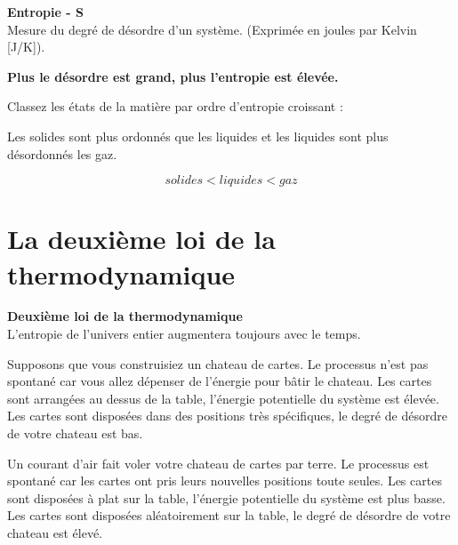 \documentclass[
  11pt,
  a4paper,
  openany]{book}
\begin{document}
\begin{tcolorbox}
\textbf{Entropie - S}\\
Mesure du degré de désordre d'un système. (Exprimée en joules par Kelvin {[}J/K{]}).

\end{tcolorbox}

\textbf{Plus le désordre est grand, plus l'entropie est élevée.}

\begin{Exercise}

Classez les états de la matière par ordre d'entropie croissant :


\end{Exercise}

\begin{Answer}
Les solides sont plus ordonnés que les liquides et les liquides sont plus désordonnés les gaz.

\[
solides < liquides < gaz
\]

\end{Answer}

\section{La deuxième loi de la thermodynamique}\label{la-deuxiuxe8me-loi-de-la-thermodynamique}

\begin{tcolorbox}
\textbf{Deuxième loi de la thermodynamique}\\
L'entropie de l'univers entier augmentera toujours avec le temps.

\end{tcolorbox}

Supposons que vous construisiez un chateau de cartes. Le processus n'est pas spontané car vous allez dépenser de l'énergie pour bâtir le chateau. Les cartes sont arrangées au dessus de la table, l'énergie potentielle du système est élevée. Les cartes sont disposées dans des positions très spécifiques, le degré de désordre de votre chateau est bas.

Un courant d'air fait voler votre chateau de cartes par terre. Le processus est spontané car les cartes ont pris leurs nouvelles positions toute seules. Les cartes sont disposées à plat sur la table, l'énergie potentielle du système est plus basse. Les cartes sont disposées aléatoirement sur la table, le degré de désordre de votre chateau est élevé.
\end{document}
